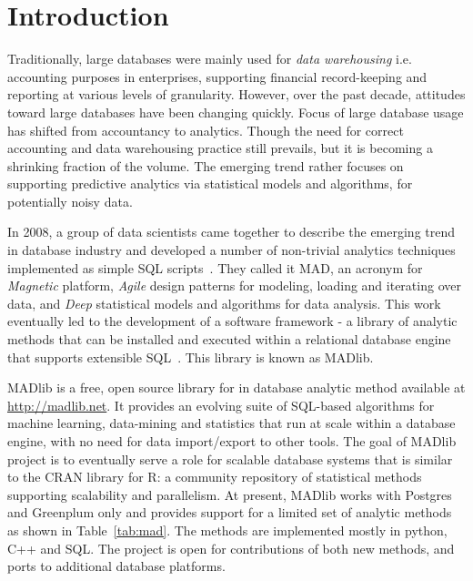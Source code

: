 \section{Introduction}
\label{sect:introduction}
Traditionally, large databases were mainly used for {\itshape data warehousing} i.e. accounting purposes in enterprises, supporting financial record-keeping and reporting at various levels of granularity. However, over the past decade, attitudes toward large databases have been changing quickly. Focus of large database usage has shifted from accountancy to analytics. Though the need for correct accounting and data warehousing practice still prevails, but it is becoming a shrinking fraction of the volume. The emerging trend rather focuses on supporting predictive analytics via statistical models and algorithms, for potentially noisy data.

In 2008, a group of data scientists came together to describe the emerging trend in database industry and developed a number of non-trivial analytics techniques implemented as simple SQL scripts~\cite{mad09}. They called it MAD, an acronym for \emph{Magnetic} platform, \emph{Agile} design patterns for modeling, loading and iterating over data, and \emph{Deep} statistical models and algorithms for data analysis. This work eventually led to the development of a software framework - a library of analytic methods that can be installed and executed within a relational database engine that supports extensible SQL~\cite{madlib12}. This library is known as MADlib.

MADlib is a free, open source library for in database analytic method available at \url{http://madlib.net}. It provides an evolving suite of SQL-based algorithms for machine learning, data-mining and statistics that run at scale within a database engine, with no need for data import/export to other tools. The goal of MADlib project is to eventually serve a role for scalable database systems that is similar to the CRAN library for R: a community repository of statistical methods supporting scalability and parallelism. At present, MADlib works with Postgres and Greenplum only and provides support for a limited set of analytic methods as shown in Table~\ref{tab:mad}. The methods are implemented mostly in python, C++ and SQL. The project is open for contributions of both new methods, and ports to additional database platforms.


